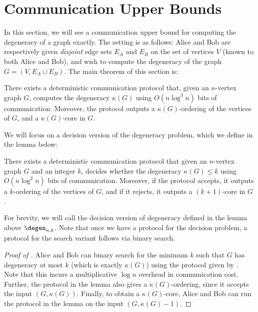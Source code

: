 
\section{Communication Upper Bounds}\label{sec:communication-upper}

In this section, we will see a communication upper bound for computing
the degeneracy of a graph exactly.
The setting is as follows:
Alice and Bob are respectively given \emph{disjoint} edge sets $E_A$ and $E_B$ on the set of
vertices $V$ (known to both Alice and Bob), and wish to compute the degeneracy of the graph
$G = (V, E_A \cup E_B)$.
The main theorem of this section is:

\begin{theorem}\label{thm:communication-upper}
  There exists a deterministic communication protocol that, given an $n$-vertex
  graph $G$, computes the degeneracy $\kappa(G)$ using $O(n \log^3 n)$ bits of
  communication.
  Moreover, the protocol outputs a $\kappa(G)$-ordering of the vertices
  of $G$, and a $\kappa(G)$-core in $G$.
\end{theorem}

We will focus on a decision version of the degeneracy problem, which we define
in the lemma below:

\begin{lemma}\label{lem:degen-decision}
  There exists a deterministic communication protocol that given an $n$-vertex
  graph $G$ and an integer $k$, decides whether the degeneracy
  $\kappa(G) \leq k$ using $O(n \log^2 n)$ bits of communication.
  Moreover, if the protocol accepts, it outputs a $k$-ordering of the vertices
  of $G$, and if it rejects, it outputs a $(k + 1)$-core in $G$.
\end{lemma}

For brevity, we will call the decision version of degeneracy defined in the
lemma above $\degen_{n, k}$.
Note that once we have a protocol for the decision problem, a protocol for the
search variant follows via binary search.
\begin{proof}[Proof of ]
  Alice and Bob can binary search for the minimum $k$ such that $G$ has
  degeneracy at most $k$ (which is exactly $\kappa(G)$) using the protocol
  given by .
  Note that this incurs a multiplicative $\log n$ overhead in communication
  cost.
  Further, the protocol in the lemma also gives a $\kappa(G)$-ordering, since
  it accepts the input $(G, \kappa(G))$.
  Finally, to obtain a $\kappa(G)$-core, Alice and Bob can run the protocol
  in the lemma on the input $(G, \kappa(G) - 1)$.
\end{proof}

